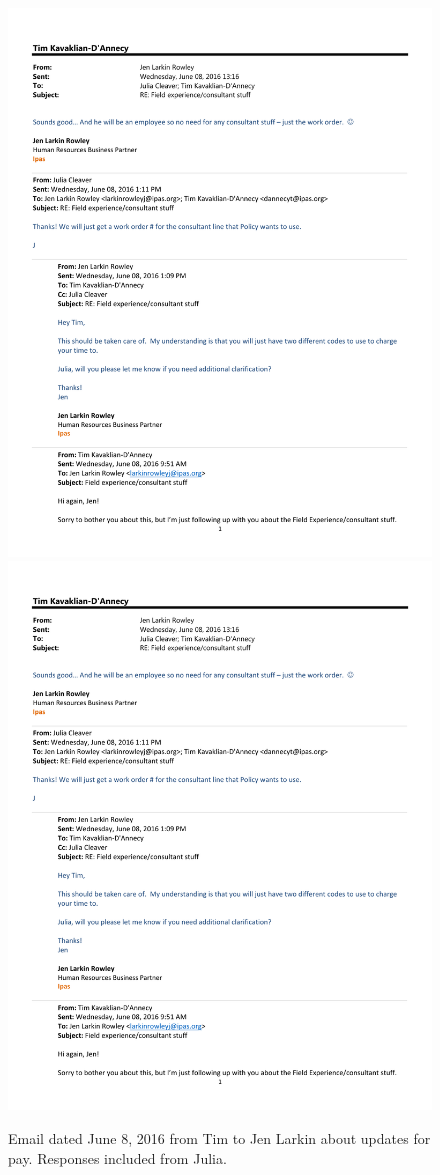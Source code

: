 \begin{figure}
   \centering
       \noindent\includegraphics[page=1,width=.45\textwidth]{documents/2016-06-08-Email-Jen-Larkin.pdf} \hfill 
       \noindent\includegraphics[page=2,width=.45\textwidth]{documents/2016-06-08-Email-Jen-Larkin.pdf}
 \caption{Email dated June 8, 2016 from Tim to Jen Larkin about updates for pay. Responses included from Julia.}
 \label{fig:2016-06-08-Email-Jen-Larkin}
\end{figure}

